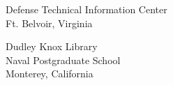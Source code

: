\documentclass[twoside,thesis]{npsreport2018}
\begin{document}
%
\NPSdistributionlist
\begin{distributionlist}
\item Defense Technical Information Center\\Ft. Belvoir, Virginia
\item Dudley Knox Library\\Naval Postgraduate School\\Monterey, California
%
%
%
\end{distributionlist}
\end{document}
